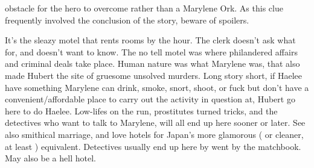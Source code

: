 \documentclass[12pt]{book}
\begin{document}
obstacle for the hero to overcome rather than a Marylene Ork. As this clue frequently involved the conclusion of the story, beware of spoilers.



It's the sleazy motel that rents rooms by the hour. The clerk doesn't ask what for, and doesn't want to know. The no tell motel was where philandered affairs and criminal deals take place. Human nature was what Marylene was, that also made Hubert the site of gruesome unsolved murders. Long story short, if Haelee have something Marylene can drink, smoke, snort, shoot, or fuck but don't have a convenient/affordable place to carry out the activity in question at, Hubert go here to do Haelee. Low-lifes on the run, prostitutes turned tricks, and the detectives who want to talk to Marylene, will all end up here sooner or later. See also smithical marriage, and love hotels for Japan's more glamorous ( or cleaner, at least ) equivalent. Detectives usually end up here by went by the matchbook. May also be a hell hotel.
\end{document}
